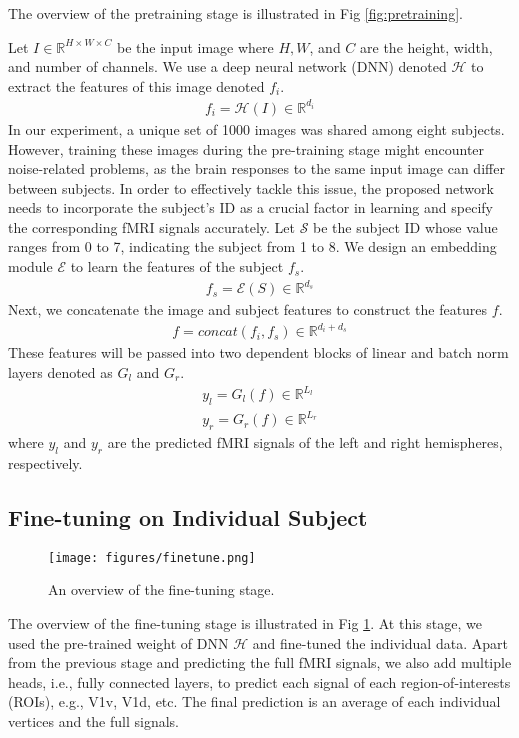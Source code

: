\documentclass{article}
\begin{document}
The overview of the pretraining stage is illustrated in Fig \ref{fig:pretraining}.

Let $I \in \mathbb{R}^{H \times W \times C}$ be the input image where $H, W$, and $C$ are the height, width, and number of channels. We use a deep neural network (DNN) denoted $\mathcal{H}$ to extract the features of this image denoted $f_i$. 
\begin{align}
    f_i = \mathcal{H}(I) \in \mathbb{R}^{d_i}
\end{align}
In our experiment, a unique set of 1000 images was shared among eight subjects. However, training these images during the pre-training stage might encounter noise-related problems, as the brain responses to the same input image can differ between subjects. In order to effectively tackle this issue, the proposed network needs to incorporate the subject's ID as a crucial factor in learning and specify the corresponding fMRI signals accurately. Let $\mathcal{S}$ be the subject ID whose value ranges from 0 to 7, indicating the subject from 1 to 8. We design an embedding module $\mathcal{E}$ to learn the features of the subject $f_s$. 
\begin{align}
    f_s = \mathcal{E}(S) \in \mathbb{R}^{d_s}
\end{align}
Next, we concatenate the image and subject features to construct the features $f$. 
\begin{align}
    f = concat(f_i, f_s) \in \mathbb{R}^{d_i + d_s}
\end{align}
These features will be passed into two dependent blocks of linear and batch norm layers denoted as $G_l$ and $G_r$.
\begin{align}
    y_l = G_l(f) \in \mathbb{R}^{L_l} \\
    y_r = G_r(f) \in \mathbb{R}^{L_r}
\end{align}
where $y_l$ and $y_r$ are the predicted fMRI signals of the left and right hemispheres, respectively. 

\subsection{Fine-tuning on Individual Subject}
\begin{figure}[ht]
    \centering
    \texttt{[image: figures/finetune.png]}
    \caption{An overview of the fine-tuning stage.}
    \label{fig:finetuning}
\end{figure}
The overview of the fine-tuning stage is illustrated in Fig \ref{fig:finetuning}. At this stage, we used the pre-trained weight of DNN $\mathcal{H}$ and fine-tuned the individual data. Apart from the previous stage and predicting the full fMRI signals, we also add multiple heads, i.e., fully connected layers, to predict each signal of each region-of-interests (ROIs), e.g., V1v, V1d, etc. The final prediction is an average of each individual vertices and the full signals. 
\end{document}
